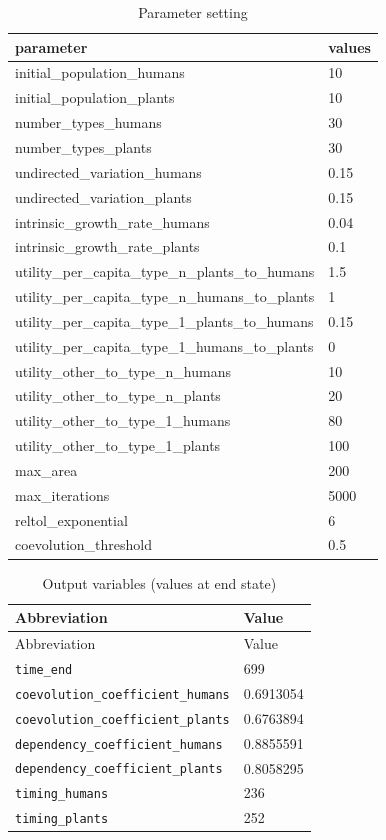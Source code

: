 \documentclass[
]{book}
\begin{document}
\begin{table}[!h]

\caption{\label{tab:1runcoevolutionsametimingparspdf}Parameter setting}
\centering
\begin{tabular}[t]{l|l}
\hline
parameter & values\\
\hline
initial\_population\_humans & 10\\
\hline
initial\_population\_plants & 10\\
\hline
number\_types\_humans & 30\\
\hline
number\_types\_plants & 30\\
\hline
undirected\_variation\_humans & 0.15\\
\hline
undirected\_variation\_plants & 0.15\\
\hline
intrinsic\_growth\_rate\_humans & 0.04\\
\hline
intrinsic\_growth\_rate\_plants & 0.1\\
\hline
utility\_per\_capita\_type\_n\_plants\_to\_humans & 1.5\\
\hline
utility\_per\_capita\_type\_n\_humans\_to\_plants & 1\\
\hline
utility\_per\_capita\_type\_1\_plants\_to\_humans & 0.15\\
\hline
utility\_per\_capita\_type\_1\_humans\_to\_plants & 0\\
\hline
utility\_other\_to\_type\_n\_humans & 10\\
\hline
utility\_other\_to\_type\_n\_plants & 20\\
\hline
utility\_other\_to\_type\_1\_humans & 80\\
\hline
utility\_other\_to\_type\_1\_plants & 100\\
\hline
max\_area & 200\\
\hline
max\_iterations & 5000\\
\hline
reltol\_exponential & 6\\
\hline
coevolution\_threshold & 0.5\\
\hline
\end{tabular}
\end{table}

\vspace{1cm}

\begin{longtable}[]{@{}ll@{}}
\caption{Output variables (values at end state)}\tabularnewline
\toprule
Abbreviation & Value\tabularnewline
\midrule
\endfirsthead
\toprule
Abbreviation & Value\tabularnewline
\midrule
\endhead
\texttt{time\_end} & 699\tabularnewline
\texttt{coevolution\_coefficient\_humans} & 0.6913054\tabularnewline
\texttt{coevolution\_coefficient\_plants} & 0.6763894\tabularnewline
\texttt{dependency\_coefficient\_humans} & 0.8855591\tabularnewline
\texttt{dependency\_coefficient\_plants} & 0.8058295\tabularnewline
\texttt{timing\_humans} & 236\tabularnewline
\texttt{timing\_plants} & 252\tabularnewline
\bottomrule
\end{longtable}
\end{document}
